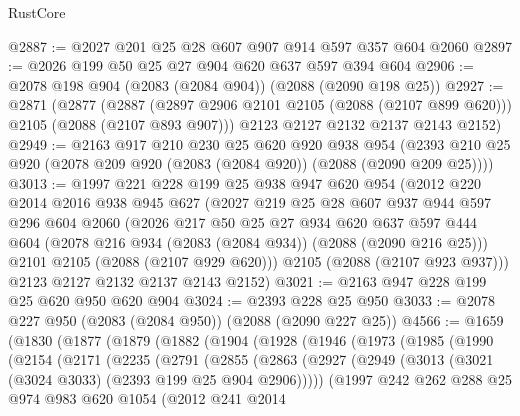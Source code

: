 \begin{lexlean}{RustCore}
\begin{coremodule}
@2887 := @2027 @201 @25 @28 @607 @907 @914 @597 @357 @604 @2060
@2897 := @2026 @199 @50 @25 @27 @904 @620 @637 @597 @394 @604
@2906 := @2078 @198 @904 (@2083 (@2084 @904)) (@2088 (@2090 @198 @25))
@2927 := @2871
    (@2877
      (@2887 (@2897 @2906 @2101 @2105 (@2088 (@2107 @899 @620))) @2105 (@2088 (@2107 @893 @907)))
      @2123
      @2127
      @2132
      @2137
      @2143
      @2152)
@2949 := @2163
    @917
    @210
    @230
    @25
    @620
    @920
    @938
    @954
    (@2393 @210 @25 @920 (@2078 @209 @920 (@2083 (@2084 @920)) (@2088 (@2090 @209 @25))))
@3013 := @1997
    @221
    @228
    @199
    @25
    @938
    @947
    @620
    @954
    (@2012
      @220
      @2014
      @2016
      @938
      @945
      @627
      (@2027
        @219
        @25
        @28
        @607
        @937
        @944
        @597
        @296
        @604
        @2060
        (@2026
          @217
          @50
          @25
          @27
          @934
          @620
          @637
          @597
          @444
          @604
          (@2078 @216 @934 (@2083 (@2084 @934)) (@2088 (@2090 @216 @25)))
          @2101
          @2105
          (@2088 (@2107 @929 @620)))
        @2105
        (@2088 (@2107 @923 @937)))
      @2123
      @2127
      @2132
      @2137
      @2143
      @2152)
@3021 := @2163 @947 @228 @199 @25 @620 @950 @620 @904
@3024 := @2393 @228 @25 @950
@3033 := @2078 @227 @950 (@2083 (@2084 @950)) (@2088 (@2090 @227 @25))
@4566 := @1659
    (@1830
      (@1877
        (@1879
          (@1882
            (@1904
              (@1928
                (@1946
                  (@1973
                    (@1985
                      (@1990
                        (@2154
                          (@2171
                            (@2235
                              (@2791
                                (@2855
                                  (@2863
                                    (@2927
                                      (@2949
                                        (@3013 (@3021 (@3024 @3033) (@2393 @199 @25 @904 @2906)))))
                                    (@1997
                                      @242
                                      @262
                                      @288
                                      @25
                                      @974
                                      @983
                                      @620
                                      @1054
                                      (@2012
                                        @241
                                        @2014

\end{coremodule}
\end{lexlean}
